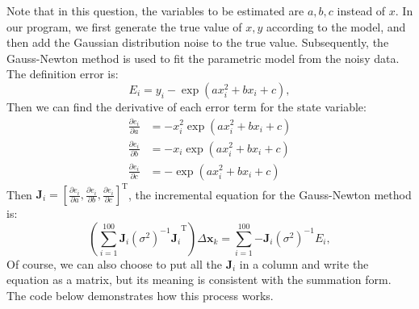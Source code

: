Note that in this question, the variables to be estimated are $a,b,c$ instead of $x$. In our program, we first generate the true value of $x, y$ according to the model, and then add the Gaussian distribution noise to the true value. Subsequently, the Gauss-Newton method is used to fit the parametric model from the noisy data. The definition error is:
\begin{equation}
E_i = y_i - \exp \left( {ax_i^2 + bx_i + c} \right),
\end{equation}
Then we can find the derivative of each error term for the state variable:
\begin{equation}
\begin{aligned}
\frac{{\partial {e_i}}}{{\partial a}} &= - x_i^2\exp \left( {ax_i^2 + b{x_i} + c} \right)\\
\frac{{\partial e_i}}{{\partial b}} &= - {x_i}\exp \left( {ax_i^2 + b{x_i} + c} \right)\\
\frac{{\partial {e_i}}}{{\partial c}} &= - \exp \left( {ax_i^2 + b{x_i} + c} \right)
\end{aligned}
\end{equation}
Then $\bm{J}_i = \left[\frac{{\partial {e_i}}}{{\partial a}},\frac{{\partial {e_i}}}{{\partial b}}, \frac{{\partial {e_i}}}{{\partial c}} \right]^\mathrm{T}$, the incremental equation for the Gauss-Newton method is:
\begin{equation}
\left(\sum\limits_{i = 1}^{100} {\bm{J}_i{(\sigma^2)^{ - 1}}{\bm{J}_i}}^\mathrm{T } \right) \Delta \bm{x}_k = \sum\limits_{i = 1}^{100} { - {\bm{J}_i}{(\sigma^2)^{ - 1}}{ E_i}},
\end{equation}
Of course, we can also choose to put all the $\bm{J}_i$ in a column and write the equation as a matrix, but its meaning is consistent with the summation form. The code below demonstrates how this process works.

